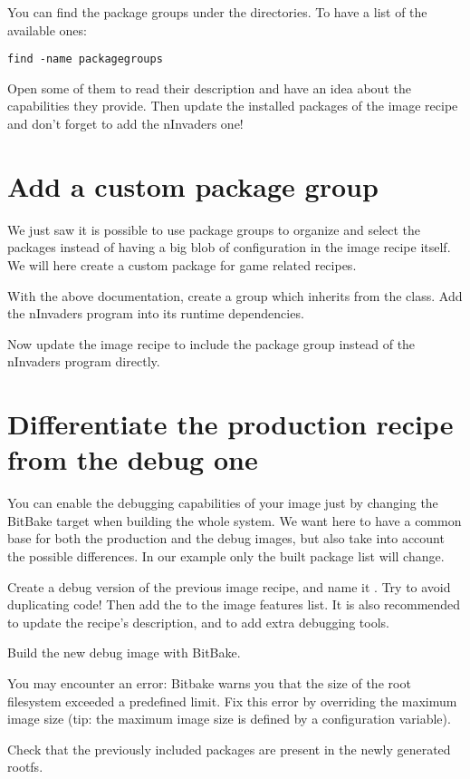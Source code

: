 You can find the package groups under the  directories. To
have a list of the available ones:
\begin{verbatim}
find -name packagegroups
\end{verbatim}

Open some of them to read their description and have an idea about the
capabilities they provide. Then update the installed packages of the image
recipe and don't forget to add the nInvaders one!

\section{Add a custom package group}

We just saw it is possible to use package groups to organize and select the
packages instead of having a big blob of configuration in the image recipe
itself. We will here create a custom package for game related recipes.

With the above documentation, create a  group
which inherits from the  class. Add the nInvaders program
into its runtime dependencies.

Now update the image recipe to include the package group instead of the
nInvaders program directly.

\section{Differentiate the production recipe from the debug one}

You can enable the debugging capabilities of your image just by changing the
BitBake target when building the whole system. We want here to have a common
base for both the production and the debug images, but also take into account the
possible differences. In our example only the built package list will change.

Create a debug version of the previous image recipe, and name it
. Try to avoid duplicating code! Then add the
 to the image features list. It is also recommended to
update the recipe's description, and to add extra debugging tools.

Build the new debug image with BitBake.

You may encounter an error: Bitbake warns you that the size of the root
filesystem exceeded a predefined limit. Fix this error by overriding the maximum
image size (tip: the maximum image size is defined by a configuration
variable).

Check that the previously included packages are present in the newly generated
rootfs.
